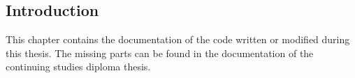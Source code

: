 \hypertarget{index_intro}{}\subsection{Introduction}\label{intro}
This chapter contains the documentation of the code written or modified during this thesis. The missing parts can be found in the documentation of the continuing studies diploma thesis.